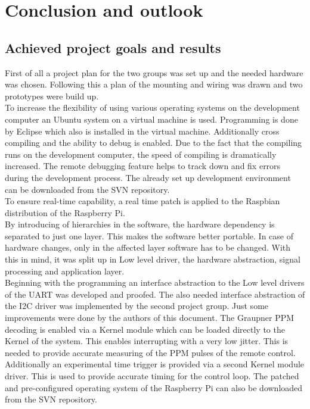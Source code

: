 \chapter{Conclusion and outlook}
\label{sec:conclusion}

\section{Achieved project goals and results}
\label{sec:conclusion:results}

First of all a project plan for the two groups was set up and the needed hardware was chosen. Following this a plan of the mounting and wiring was drawn and two prototypes were build up.\\
To increase the flexibility of using various operating systems on the development computer an Ubuntu system on a virtual machine is used. Programming is done by Eclipse which also is installed in the virtual machine. Additionally cross compiling and the ability to debug is enabled. Due to the fact that the compiling runs on the development computer, the speed of compiling is dramatically increased. The remote debugging feature helps to track down and fix errors during the development process. The already set up development environment can be downloaded from the SVN repository.\\
To ensure real-time capability, a real time patch is applied to the Raspbian distribution of the Raspberry Pi.\\
By introducing of hierarchies in the software, the hardware dependency is separated to just one layer. This makes the software better portable. In case of hardware changes, only in the affected layer software has to be changed. With this in mind, it was split up in Low level driver, the hardware abstraction, signal processing and application layer.\\
Beginning with the programming an interface abstraction to the Low level drivers of the UART was developed and proofed. The also needed interface abstraction of the I2C driver was implemented by the second project group. Just some improvements were done by the authors of this document. The Graupner PPM decoding is enabled via a Kernel module which can be loaded directly to the Kernel of the system. This enables interrupting with a very low jitter. This is needed to provide accurate measuring of the PPM pulses of the remote control. Additionally an experimental time trigger is provided via a second Kernel module driver. This is used to provide accurate timing for the control loop. The patched and pre-configured operating system of the Raspberry Pi can also be downloaded from the SVN repository.\\
